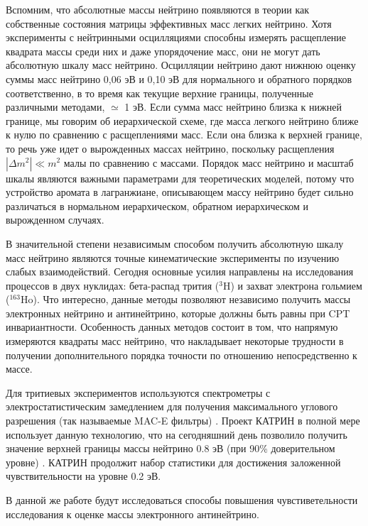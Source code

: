 \documentclass[a4paper,14pt]{extarticle}
\begin{document}
    Вспомним, что абсолютные массы нейтрино появляются в теории как собственные состояния матрицы 
    эффективных масс легких нейтрино. Хотя эксперименты с нейтринными осцилляциями способны измерять 
    расщепление квадрата массы среди них и даже упорядочение масс, они не могут дать абсолютную 
    шкалу масс нейтрино. Осцилляции нейтрино дают нижнюю оценку суммы масс нейтрино 0,06 эВ и 0,10 эВ 
    для нормального и обратного порядков соответственно, в то время как текущие верхние границы, полученные 
    различными методами, $\simeq$ 1 эВ. Если сумма масс нейтрино близка к нижней границе, мы говорим 
    об иерархической схеме, где масса легкого нейтрино ближе к нулю по сравнению с расщеплениями масс. 
    Если она близка к верхней границе, то речь уже идет о вырожденных массах нейтрино, поскольку расщепления 
    $|\Delta m^2| \ll m^2 $ малы по сравнению с массами. Порядок масс нейтрино и масштаб шкалы являются
    важными параметрами для теоретических моделей, потому что устройство аромата в лагранжиане, описывающем 
    массу нейтрино будет сильно различаться в нормальном иерархическом, обратном иерархическом и вырожденном случаях. 
    
    В значительной степени независимым способом получить абсолютную шкалу масс нейтрино 
    являются точные кинематические эксперименты по изучению слабых взаимодействий. Сегодня 
    основные усилия направлены на исследования процессов в двух нуклидах: бета-распад трития ($^{3}$H) и 
    захват электрона гольмием ($^{163}$Ho). Что интересно, данные методы позволяют независимо 
    получить массы электронных нейтрино и антинейтрино, которые должны быть равны при CPT 
    инвариантности. Особенность данных методов состоит в том, что напрямую измеряются квадраты
    масс нейтрино, что накладывает некоторые трудности в получении дополнительного порядка
    точности по отношению непосредственно к массе. 
    
    Для тритиевых экспериментов используются спектрометры с электростатистическим замедлением
    для получения максимального углового разрешения (так называемые MAC-E фильтры) \cite{lobashev} \cite{picard}.
    Проект КАТРИН в полной мере использует данную технологию, что на сегодняшний день позволило
    получить значение верхней границы массы нейтрино 0.8 эВ (при 90\% доверительном уровне) \cite{aker}.
    КАТРИН продолжит набор статистики для достижения заложенной чувствительности на уровне
    0.2 эВ.
    
    В данной же работе будут исследоваться способы повышения чувстиветельности исследования к 
    оценке массы электронного антинейтрино.
     
\end{document}
